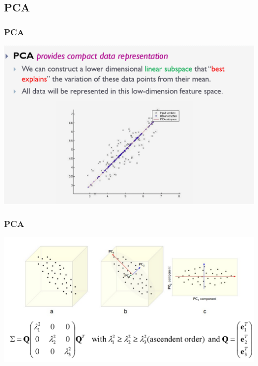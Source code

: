 \documentclass[11pt]{beamer}
\begin{document}
\subsection{PCA}
\begin{frame}
\frametitle{PCA}
\includegraphics[width=\textwidth]{PCA1.png}
\end{frame}
\begin{frame}
\frametitle{PCA}
\includegraphics[width=\textwidth]{PCA2.png}
\end{frame}
\end{document}
